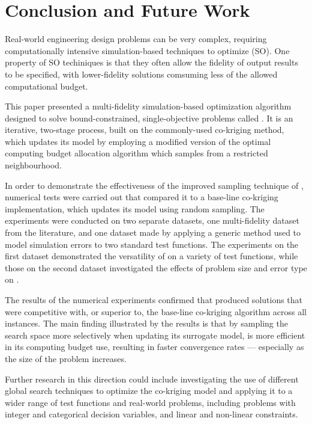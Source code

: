 \section{Conclusion and Future Work}\label{sec:conc}
Real-world engineering design problems can be very complex, requiring computationally intensive simulation-based techniques to optimize (SO). One property of SO techiniques is that they often allow the fidelity of output results to be specified, with lower-fidelity solutions comsuming less of the allowed computational budget.

This paper presented a multi-fidelity simulation-based optimization algorithm designed to solve bound-constrained, single-objective problems called \AlgName{}. It is an iterative, two-stage process, built on the commonly-used co-kriging method, which updates its model by employing a modified version of the optimal computing budget allocation algorithm which samples from a restricted neighbourhood.  

In order to demonstrate the effectiveness of the improved sampling technique of \AlgName{}, numerical tests were carried out that compared it to a base-line co-kriging implementation, which updates its model using random sampling. The experiments were conducted on two separate datasets, one multi-fidelity dataset from the literature, and one dataset made by applying a generic method used to model simulation errors to two standard test functions. The experiments on the first dataset demonstrated the versatility of \AlgName{} on a variety of test functions, while those on the second dataset investigated the effects of problem size and error type on \AlgName{}.

The results of the numerical experiments confirmed that \AlgName{} produced solutions that were competitive with, or superior to, the base-line co-kriging algorithm across all instances. The main finding illustrated by the results is that by sampling the search space more selectively when updating its surrogate model, \AlgName{} is more efficient in its computing budget use, resulting in faster convergence rates --- especially as the size of the problem increases.

Further research in this direction could include investigating the use of different global search techniques to optimize the co-kriging model and applying it to a wider range of test functions and real-world problems, including problems with integer and categorical decision variables, and linear and non-linear constraints.